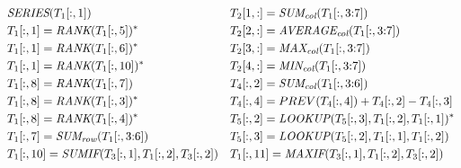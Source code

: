 \begin{figure}[thb]
\begin{subfigure}{1\textwidth}
{\begin{align*}
%
      &~\ecseries{\range{T_{1}}{\rangeall}{1}}                                  && \ecsumc{\range{T_{2}}{1}{\rangeall}}{\range{T_{1}}{\rangeall}{\rangeto{3}{7}}} \\
      &~\ecrank{\range{T_{1}}{\rangeall}{1}}{\range{T_{1}}{\rangeall}{5}}^*     && \ecaggc{\textit{AVERAGE}}{\range{T_{2}}{2}{\rangeall}}{\range{T_{1}}{\rangeall}{\rangeto{3}{7}}}  \\
      &~\ecrank{\range{T_{1}}{\rangeall}{1}}{\range{T_{1}}{\rangeall}{6}}^*     && \ecaggc{\textit{MAX}}{\range{T_{2}}{3}{\rangeall}}{\range{T_{1}}{\rangeall}{\rangeto{3}{7}}} \\
      &~\ecrank{\range{T_{1}}{\rangeall}{1}}{\range{T_{1}}{\rangeall}{10}}^*    && \ecaggc{\textit{MIN}}{\range{T_{2}}{4}{\rangeall}}{\range{T_{1}}{\rangeall}{\rangeto{3}{7}}} \\
      &~\ecrank{\range{T_{1}}{\rangeall}{8}}{\range{T_{1}}{\rangeall}{7}}       && \ecsumc{\range{T_{4}}{\rangeall}{2}}{\range{T_{1}}{\rangeall}{\rangeto{3}{6}}} \\
      &~\ecrank{\range{T_{1}}{\rangeall}{8}}{\range{T_{1}}{\rangeall}{3}}^*     && \range{T_{4}}{\rangeall}{4} = PREV(\range{T_{4}}{\rangeall}{4}) + \range{T_{4}}{\rangeall}{2} - \range{T_{4}}{\rangeall}{3} \\
      &~\ecrank{\range{T_{1}}{\rangeall}{8}}{\range{T_{1}}{\rangeall}{4}}^*    && \eclookup{\range{T_{5}}{\rangeall}{2}}{\range{T_{5}}{\rangeall}{3}}{\range{T_{1}}{\rangeall}{2}}{\range{T_{1}}{\rangeall}{1}}^*\\
%
      &~\ecsumr{\range{T_{1}}{\rangeall}{7}}{\range{T_{1}}{\rangeall}{\rangeto{3}{6}}}   && \eclookup{\range{T_{5}}{\rangeall}{3}}{\range{T_{5}}{\rangeall}{2}}{\range{T_{1}}{\rangeall}{1}}{\range{T_{1}}{\rangeall}{2}} \\
%
      &~\ecaggif{\textit{SUM}}{\range{T_{1}}{\rangeall}{10}}{\range{T_{3}}{\rangeall}{1}}{\range{T_{1}}{\rangeall}{2}}{\range{T_{3}}{\rangeall}{2}}   && \ecaggif{\textit{MAX}}{\range{T_{1}}{\rangeall}{11}}{\range{T_{3}}{\rangeall}{1}}{\range{T_{1}}{\rangeall}{2}}{\range{T_{3}}{\rangeall}{2}} 
%
%
%
%

\end{align*}}
\end{subfigure}
\end{figure}
